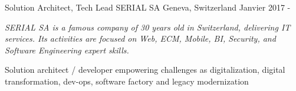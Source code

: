

\begin{cventries}

\cventry
{Solution Architect, Tech Lead} %
{SERIAL SA} %
{Geneva, Switzerland} %
{Janvier 2017 - } %
{
	\begin{cvitems} %
		\item {\textit{SERIAL SA is a famous company of 30 years old in Switzerland, delivering IT services. Its activities are focused on Web, ECM, Mobile, BI, Security, and Software Engineering expert skills.}}
		\item {Solution architect / developer empowering challenges as digitalization, digital transformation, dev-ops, software factory and legacy modernization}
	\end{cvitems}
}


\end{cventries}
